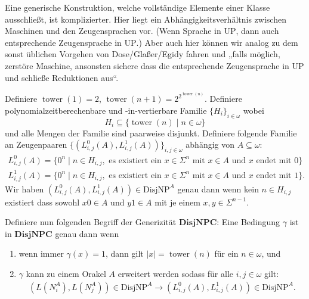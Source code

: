 \documentclass[nofonts]{uebung}
\def\UP{\ensuremath{\mathrm{UP}}}
\def\DisjNP{\ensuremath{\mathrm{DisjNP}}}
\DeclareMathOperator{\tower}{tower}
\begin{document}
Eine generische Konstruktion, welche vollständige Elemente einer Klasse ausschließt, ist komplizierter. Hier liegt ein Abhängigkeitsverhältnis zwischen Maschinen und den Zeugensprachen vor. (Wenn Sprache in $\UP$, dann auch entsprechende Zeugensprache in $\UP$.)
Aber auch hier können wir analog zu dem sonst üblichen Vorgehen von Dose/Glaßer/Egidy fahren und „falls möglich, zerstöre Maschine, ansonsten sichere dass die entsprechende Zeugensprache in $\UP$ und schließe Reduktionen aus“.


Definiere $\tower(1)=2$, $\tower(n+1)=2^{2^{\tower(n)}}$.
Definiere polynomialzeitberechenbare und -in-\linebreak{}vertierbare Familie $\{H_{i}\}_{i\in\omega}$ wobei
\[ H_{i} \subseteq \{ \tower(n) \mid n\in\omega \} \]
und alle Mengen der Familie sind paarweise disjunkt.
Definiere folgende Familie an Zeugenpaaren $\{(L^0_{i,j}(A), L^1_{i,j}(A)) \}_{i,j\in\omega}$ abhängig von $A\subseteq\omega$:
\begin{gather*}
    L^0_{i,j}(A) = \{ 0^n \mid n\in H_{i,j}, \text{ es existiert ein $x\in\Sigma^n$ mit $x\in A$ und $x$ endet mit $0$} \}\\
    L^1_{i,j}(A) = \{ 0^n \mid n\in H_{i,j}, \text{ es existiert ein $x\in\Sigma^n$ mit $x\in A$ und $x$ endet mit $1$} \}.
\end{gather*}
Wir haben $(L^0_{i,j}(A), L^1_{i,j}(A))\in\DisjNP^A$ genau dann wenn kein $n\in H_{i,j}$ existiert dass sowohl $x0\in A$ und $y1\in A$ mit je einem $x,y\in\Sigma^{n-1}$.


Definiere nun folgenden Begriff der Generizität $\mathbf{DisjNPC}$: Eine Bedingung $\gamma$ ist in $\mathbf{DisjNPC}$
genau dann wenn 
\begin{enumerate}
    \item wenn immer $\gamma(x)=1$, dann gilt $|x|=\tower(n)$ für ein $n\in\omega$, und
    \item $\gamma$ kann zu einem Orakel $A$ erweitert werden sodass für alle $i,j\in\omega$ gilt:
\begin{gather*}
(L(N_i^A), L(N_j^A))\in\DisjNP^A\rightarrow (L^0_{i,j}(A), L^1_{i,j}(A))\in\DisjNP^A . \tag{\ast}
\end{gather*}
\end{enumerate}
\end{document}
